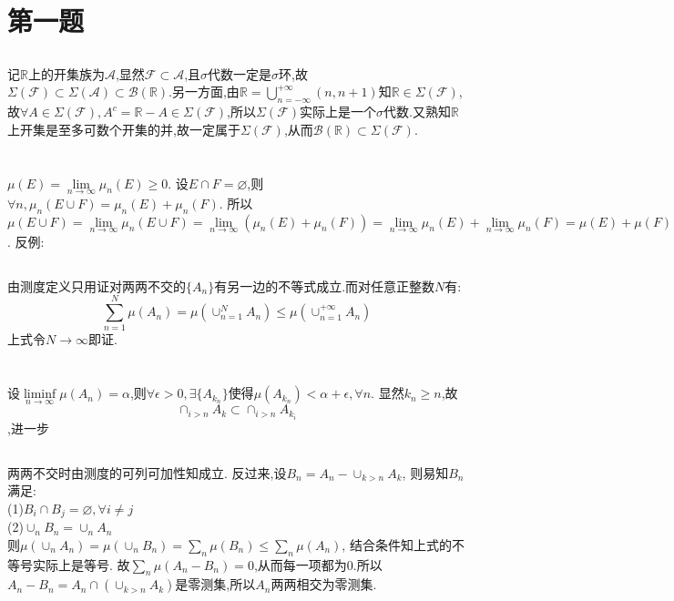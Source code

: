 \documentclass{ctexart}
\begin{document}
	\section{第一题}
	\subsection{}
	记$\mathbb{R}$上的开集族为$\mathcal{A}$,显然$\mathcal{F}\subset\mathcal{A}$,且$\sigma$代数一定是$\sigma$环,故$\Sigma(\mathcal{F})\subset\Sigma(\mathcal{A})\subset\mathcal{B}(\mathbb{R})$.另一方面,由$\mathbb{R}=\bigcup_{n=-\infty}^{+\infty}(n,n+1)$知$\mathbb{R}\in\Sigma(\mathcal{F})$,故$\forall A\in\Sigma(\mathcal{F}),A^c=\mathbb{R}-A\in\Sigma(\mathcal{F})$,所以$\Sigma(\mathcal{F})$实际上是一个$\sigma$代数.又熟知$\mathbb{R}$上开集是至多可数个开集的并,故一定属于$\Sigma(\mathcal{F})$,从而$\mathcal{B}(\mathbb{R})\subset\Sigma(\mathcal{F})$.
	\subsection{}
\section{}
\subsection{}
$\mu(E)=\lim\limits_{n\rightarrow\infty}\mu_n(E)\geq0$.
设$E\cap F=\varnothing$,则$\forall n,\mu_n(E\cup F)=\mu_n(E)+\mu_n(F)$.
所以$\mu(E\cup F)=\lim\limits_{n\rightarrow\infty}\mu_n(E\cup F)=\lim\limits_{n\rightarrow\infty}(\mu_n(E)+\mu_n(F))=\lim\limits_{n\rightarrow\infty}\mu_n(E)+\lim\limits_{n\rightarrow\infty}\mu_n(F)=\mu(E)+\mu(F)$.
反例:
\subsection{}
由测度定义只用证对两两不交的$\{A_n\}$有另一边的不等式成立.而对任意正整数$N$有:
$$\sum_{n=1}^{N}\mu(A_n)=\mu(\cup_{n=1}^NA_n)\leq \mu(\cup_{n=1}^{+\infty}A_n)$$
上式令$N\rightarrow \infty$即证.
\section{}
设$\liminf\limits_{n\rightarrow\infty}\mu(A_n)=\alpha$,则$\forall \epsilon>0,\exists \{A_{k_n}\}$使得$\mu(A_{k_n})< \alpha+\epsilon,\forall n$.
显然$k_n\geq n$,故$$\cap_{i>n}A_k\subset\cap_{i>n}A_{k_i}$$,进一步
\subsection{}
两两不交时由测度的可列可加性知成立.
反过来,设$B_n=A_n-\cup_{k>n}A_k$,
则易知$B_n$满足:\\
(1)$B_i\cap B_j=\varnothing,\forall i\neq j$\\
(2)$\cup_nB_n=\cup_nA_n$\\
则$\mu(\cup_nA_n)=\mu(\cup_nB_n)=\sum_n\mu(B_n)\leq\sum_n\mu(A_n)$,
结合条件知上式的不等号实际上是等号.
故$\sum_n\mu(A_n-B_n)=0$,从而每一项都为0.所以$A_n-B_n=A_n\cap (\cup_{k>n}A_k)$是零测集,所以${A_n}$两两相交为零测集.
\end{document}

